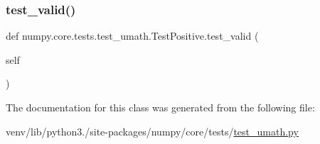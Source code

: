 \subsubsection{\texorpdfstring{test\+\_\+valid()}{test\_valid()}}
{\footnotesize\ttfamily def numpy.\+core.\+tests.\+test\+\_\+umath.\+Test\+Positive.\+test\+\_\+valid (\begin{DoxyParamCaption}\item[{}]{self }\end{DoxyParamCaption})}



The documentation for this class was generated from the following file\+:\begin{DoxyCompactItemize}
\item 
venv/lib/python3./site-\/packages/numpy/core/tests/\hyperlink{test__umath_8py}{test\+\_\+umath.\+py}\end{DoxyCompactItemize}
